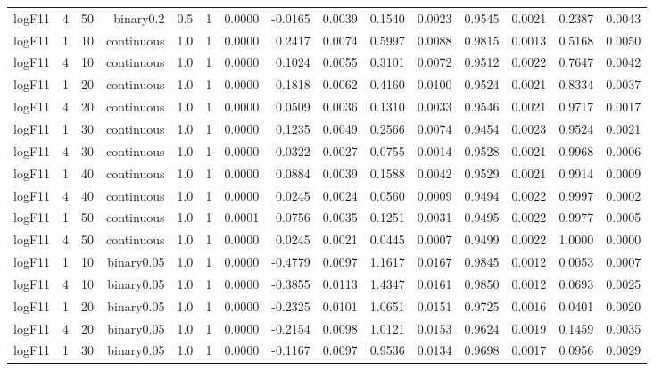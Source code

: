 \begin{longtable}{rrrrrrrrrrrrrrr}
  logF11 & 4 & 50 & binary0.2 & 0.5 & 1 & 0.0000 & -0.0165 & 0.0039 & 0.1540 & 0.0023 & 0.9545 & 0.0021 & 0.2387 & 0.0043 \\ 
  logF11 & 1 & 10 & continuous & 1.0 & 1 & 0.0000 & 0.2417 & 0.0074 & 0.5997 & 0.0088 & 0.9815 & 0.0013 & 0.5168 & 0.0050 \\ 
  logF11 & 4 & 10 & continuous & 1.0 & 1 & 0.0000 & 0.1024 & 0.0055 & 0.3101 & 0.0072 & 0.9512 & 0.0022 & 0.7647 & 0.0042 \\ 
  logF11 & 1 & 20 & continuous & 1.0 & 1 & 0.0000 & 0.1818 & 0.0062 & 0.4160 & 0.0100 & 0.9524 & 0.0021 & 0.8334 & 0.0037 \\ 
  logF11 & 4 & 20 & continuous & 1.0 & 1 & 0.0000 & 0.0509 & 0.0036 & 0.1310 & 0.0033 & 0.9546 & 0.0021 & 0.9717 & 0.0017 \\ 
  logF11 & 1 & 30 & continuous & 1.0 & 1 & 0.0000 & 0.1235 & 0.0049 & 0.2566 & 0.0074 & 0.9454 & 0.0023 & 0.9524 & 0.0021 \\ 
  logF11 & 4 & 30 & continuous & 1.0 & 1 & 0.0000 & 0.0322 & 0.0027 & 0.0755 & 0.0014 & 0.9528 & 0.0021 & 0.9968 & 0.0006 \\ 
  logF11 & 1 & 40 & continuous & 1.0 & 1 & 0.0000 & 0.0884 & 0.0039 & 0.1588 & 0.0042 & 0.9529 & 0.0021 & 0.9914 & 0.0009 \\ 
  logF11 & 4 & 40 & continuous & 1.0 & 1 & 0.0000 & 0.0245 & 0.0024 & 0.0560 & 0.0009 & 0.9494 & 0.0022 & 0.9997 & 0.0002 \\ 
  logF11 & 1 & 50 & continuous & 1.0 & 1 & 0.0001 & 0.0756 & 0.0035 & 0.1251 & 0.0031 & 0.9495 & 0.0022 & 0.9977 & 0.0005 \\ 
  logF11 & 4 & 50 & continuous & 1.0 & 1 & 0.0000 & 0.0245 & 0.0021 & 0.0445 & 0.0007 & 0.9499 & 0.0022 & 1.0000 & 0.0000 \\ 
  logF11 & 1 & 10 & binary0.05 & 1.0 & 1 & 0.0000 & -0.4779 & 0.0097 & 1.1617 & 0.0167 & 0.9845 & 0.0012 & 0.0053 & 0.0007 \\ 
  logF11 & 4 & 10 & binary0.05 & 1.0 & 1 & 0.0000 & -0.3855 & 0.0113 & 1.4347 & 0.0161 & 0.9850 & 0.0012 & 0.0693 & 0.0025 \\ 
  logF11 & 1 & 20 & binary0.05 & 1.0 & 1 & 0.0000 & -0.2325 & 0.0101 & 1.0651 & 0.0151 & 0.9725 & 0.0016 & 0.0401 & 0.0020 \\ 
  logF11 & 4 & 20 & binary0.05 & 1.0 & 1 & 0.0000 & -0.2154 & 0.0098 & 1.0121 & 0.0153 & 0.9624 & 0.0019 & 0.1459 & 0.0035 \\ 
  logF11 & 1 & 30 & binary0.05 & 1.0 & 1 & 0.0000 & -0.1167 & 0.0097 & 0.9536 & 0.0134 & 0.9698 & 0.0017 & 0.0956 & 0.0029 \\ 

\end{longtable}
